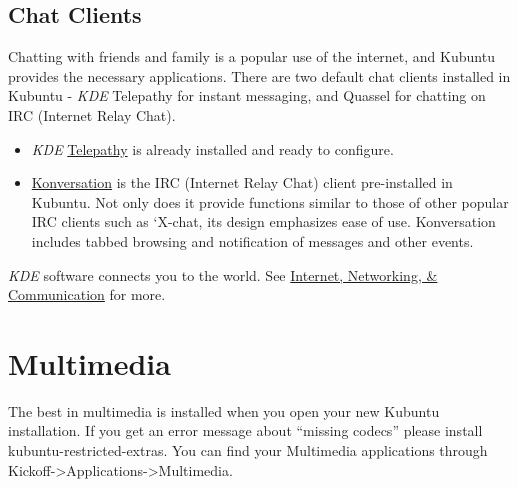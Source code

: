 \documentclass[letterpaper,10pt,english]{sphinxmanual}
\begin{document}
\subsection{Chat Clients}
\label{docs/software:chat-clients}
Chatting with friends and family is a popular use of the internet, and Kubuntu provides the necessary applications. There are two default chat clients installed in Kubuntu - \emph{KDE} Telepathy for instant messaging, and Quassel for chatting on IRC (Internet Relay Chat).
\begin{itemize}
\item {} 
\emph{KDE} \href{https://userbase.kde.org/Special:MyLanguage/Telepathy}{Telepathy} is already installed and ready to configure.

\item {} 
\href{https://userbase.kde.org/Special:MyLanguage/Konversation}{Konversation} is the IRC (Internet Relay Chat) client pre-installed in Kubuntu. Not only does it provide functions similar to those of other popular IRC clients such as `X-chat, its design emphasizes ease of use. Konversation includes tabbed browsing and notification of messages and other events.

\end{itemize}

\emph{KDE} software connects you to the world. See \href{https://userbase.kde.org/Special:MyLanguage/Applications/Internet}{Internet, Networking, \& Communication} for more.


\section{Multimedia}
\label{docs/software:multimedia}
The best in multimedia is installed when you open your new Kubuntu installation. If you get an error message about ``missing codecs'' please install kubuntu-restricted-extras. You can find your Multimedia applications through Kickoff-\textgreater{}Applications-\textgreater{}Multimedia.
\end{document}
